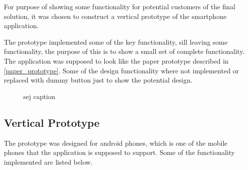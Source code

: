 For purpose of showing some functionality for potential customers of the final solution, it was chosen to construct a vertical prototype of the smartphone application.

The prototype implemented some of the key functionality, sill leaving some functionality, the purpose of this is to show a small set of complete functionality. The application was supposed to look like the paper prototype described in \cref{paper_prototype}. Some of the design functionality where not implemented or replaced with dummy button just to show the potential design.  

\begin{figure}[h!]
  \centering
  \caption{sej caption}
\end{figure}

\subsection{Vertical Prototype}
\label{sub:vertical_prototype}
The prototype was designed for android phones, which is one of the mobile phones that the application is supposed to support. Some of the functionality implemented are listed below. 


